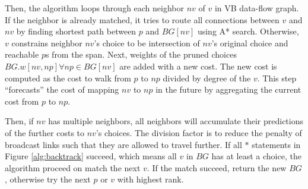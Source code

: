 Then, the algorithm loops through each neighbor $nv$ of $v$ in VB
data-flow graph. If the neighbor is already matched, it tries to route all connections between $v$
and $nv$ by finding shortest path between $p$ and $BG[nv]$ using A* search. Otherwise, $v$
constrains
neighbor $nv$'s choice to be intersection of $nv$'s original choice and reachable $p$s from the {\sc
span}. Next, weights of the pruned choices $BG.w[nv,np] \forall np \in BG[nv]$ are added with a new cost.
The new cost is computed as the cost to walk from $p$ to $np$ divided by degree of the $v$. This step ``forecasts'' the cost of mapping $nv$ to $np$ in the future by aggregating the current cost from $p$ to $np$. 

Then, if $nv$ has multiple neighbors, all neighbors will accumulate their predictions of the further costs to $nv$'s choices. The division factor
is to reduce the penalty of broadcast links such that they are allowed to travel further. If all
$*$ statements in Figure \ref{alg:backtrack} succeed, which means all $v$ in $BG$ has at least a
choice, the algorithm proceed on {\sc match} the next $v$. If the {\sc match} succeed, return the
new $BG$, otherwise try the next $p$ or $v$ with highest rank.

